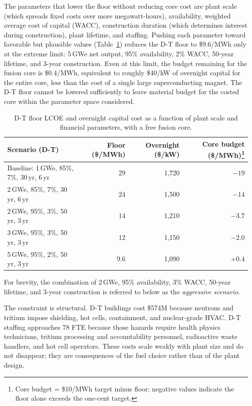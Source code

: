 \documentclass{article}
\begin{document}
The parameters that lower the floor without reducing core cost are
plant scale (which spreads fixed costs over more megawatt-hours),
availability, weighted average cost of capital (WACC), construction
duration (which determines interest during construction), plant
lifetime, and staffing. Pushing each parameter toward favorable but
plausible values (Table~\ref{tab:dt-sweep}) reduces the D-T floor to
\$9.6/MWh only at the extreme limit: 5\,GWe net
output, 95\% availability, 2\% WACC, 50-year lifetime, and 3-year
construction. Even at this limit, the budget remaining for the
fusion core is \$0.4/MWh, equivalent to roughly \$40/kW of
overnight capital for the entire core, less than the cost of a
single large superconducting magnet. The D-T floor cannot be
lowered sufficiently to leave material budget for the costed core
within the parameter space considered.

\begin{table}[htbp]
\caption{D-T floor LCOE and overnight capital cost as a function of
plant scale and financial parameters, with a free fusion core.}
\label{tab:dt-sweep}
\centering
\begin{tabular}{lrrr}
\toprule
Scenario (D-T) & Floor (\$/MWh) & Overnight (\$/kW) & Core
budget (\$/MWh)\footnote{Core budget = \$10/MWh target minus floor;
negative values indicate the floor alone exceeds the one-cent
target.} \\
\midrule
Baseline: 1\,GWe, 85\%, 7\%, 30\,yr, 6\,yr & 29 & 1{,}720 & $-19$ \\
2\,GWe, 85\%, 7\%, 30\,yr, 6\,yr & 24 & 1{,}500 & $-14$ \\
2\,GWe, 95\%, 3\%, 50\,yr, 3\,yr & 14 & 1{,}210 & $-3.7$ \\
3\,GWe, 95\%, 3\%, 50\,yr, 3\,yr & 12 & 1{,}150 & $-2.0$ \\
5\,GWe, 95\%, 2\%, 50\,yr, 3\,yr & 9.6 & 1{,}090 & $+0.4$ \\
\bottomrule
\end{tabular}
\end{table}

For brevity, the combination of 2\,GWe, 95\% availability, 3\% WACC,
50-year lifetime, and 3-year construction is referred to below as
the \emph{aggressive scenario}.

The constraint is structural. D-T buildings cost \$574M because
neutrons and tritium impose shielding, hot cells, containment, and
nuclear-grade HVAC. D-T staffing approaches 78 FTE because those
hazards require health physics technicians, tritium processing and
accountability personnel, radioactive waste handlers, and hot cell
operators. These costs scale weakly with plant size and do not
disappear; they are consequences of the fuel choice rather than of
the plant design.
\end{document}
